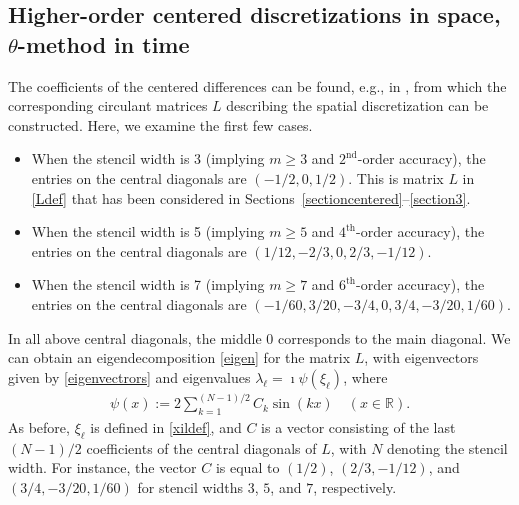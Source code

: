 \documentclass[smallextended,numbook,runningheads]{svjour3}     %
\newcommand{\rr}{\mathbb{R}}
\begin{document}
\subsection{Higher-order centered discretizations in space, \texorpdfstring{$\theta$}{}-method in time}\label{highercentered}
The coefficients of the centered differences can be found, e.g., in \cite{bengt}, from which the
corresponding circulant matrices $L$ describing the spatial discretization can be constructed.
Here, we examine the first few cases.
\begin{itemize}
\item When the stencil width is 3 (implying  $m\ge 3$ and $2^\text{nd}$-order accuracy), the entries on
the central diagonals are $(-1/2, 0, 1/2)$. This is matrix $L$ in \eqref{Ldef} that has been considered in
Sections~\ref{sectioncentered}--\ref{section3}.
\item When the stencil width is 5 (implying  $m\ge 5$ and $4^\text{th}$-order accuracy), the entries on
the central diagonals are $(1/12, -2/3, 0, 2/3, -1/12)$.
\item When the stencil width is 7 (implying $m\ge 7$ and $6^\text{th}$-order accuracy), the entries on the
central diagonals are $(-1/60, 3/20, -3/4, 0, 3/4, -3/20, 1/60)$.
\end{itemize}
In all above central diagonals, the middle $0$ corresponds to the main diagonal.
We can obtain an eigendecomposition \eqref{eigen} for the matrix $L$, with eigenvectors given by
\eqref{eigenvectrors} and eigenvalues $\lambda_\ell = \imath \psi(\xi_\ell)$, where
\begin{align}\label{psi}
	\psi(x) := 2 \sum_{k=1}^{(N-1)/2} C_k \sin(k x) \quad (x\in\rr).
\end{align}
As before, $\xi_\ell$ is defined in \eqref{xildef}, and $C$ is a vector consisting of the last $(N-1)/2$
coefficients of the central diagonals of $L$, with $N$ denoting the stencil width.
For instance, the vector $C$ is equal to $(1/2)$, $(2/3,-1/12)$, and $(3/4,-3/20,1/60)$ for stencil widths
$3$, $5$, and $7$, respectively.
\end{document}
